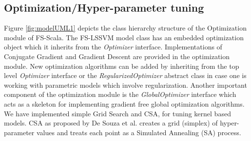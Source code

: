 \documentclass[conference, cmex10]{IEEEtran}
\begin{document}
\subsection*{Optimization/Hyper-parameter tuning}
Figure \ref{fig:modelUML1} depicts the class hierarchy structure of the Optimization module of FS-Scala. The FS-LSSVM model class has an embedded optimization object which it inherits from the \textit{Optimizer} interface. Implementations of Conjugate Gradient and Gradient Descent are provided in the optimization module. New optimization algorithms can be added by inheriting from the top level \textit{Optimizer} interface or the \textit{RegularizedOptimizer} abstract class in case one is working with parametric models which involve regularization. Another important component of the optimization module is the \textit{GlobalOptimizer} interface which acts as a skeleton for implementing gradient free global optimization algorithms. We have implemented simple Grid Search and CSA, for tuning kernel based models. CSA as proposed by De Souza et al. \cite{Xavier-De-Souza2010} creates a grid (simplex) of hyper-parameter values and treats each point as a Simulated Annealing (SA) process.
\end{document}
